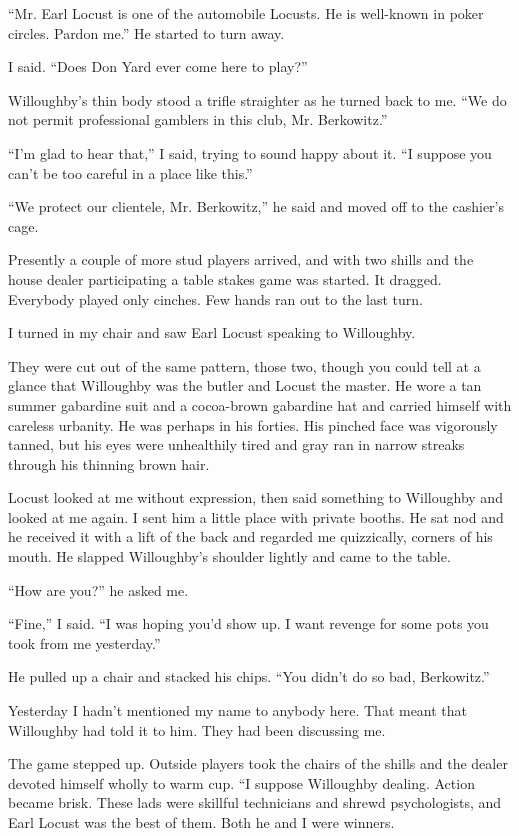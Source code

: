 \documentclass{novel}
\begin{document}
“Mr. Earl Locust is one of the automobile Locusts. He is well-known in poker circles. Pardon me.” He started to turn away.

I said. “Does Don Yard ever come here to play?”

Willoughby’s thin body stood a trifle straighter as he turned back to me. “We do not permit professional gamblers in this club, Mr. Berkowitz.”

“I’m glad to hear that,” I said, trying to sound happy about it. “I suppose you can’t be too careful in a place like this.”

“We protect our clientele, Mr. Berkowitz,” he said and moved off to the cashier’s cage.

Presently a couple of more stud players arrived, and with two shills and the house dealer participating a table stakes game was started. It dragged. Everybody played only cinches. Few hands ran out to the last turn.

\scenestars

I turned in my chair and saw Earl Locust speaking to Willoughby.

They were cut out of the same pattern, those two, though you could tell at a glance that Willoughby was the butler and Locust the master. He wore a tan summer gabardine suit and a cocoa-brown gabardine hat and carried himself with careless urbanity. He was perhaps in his forties. His pinched face was vigorously tanned, but his eyes were unhealthily tired and gray ran in narrow streaks through his thinning brown hair.

Locust looked at me without expression, then said something to Willoughby and looked at me again. I sent him a little place with private booths. He sat nod and he received it with a lift of the back and regarded me quizzically, corners of his mouth. He slapped Willoughby’s shoulder lightly and came to the table.

“How are you?” he asked me.

“Fine,” I said. “I was hoping you’d show up. I want revenge for some pots you took from me yesterday.”

He pulled up a chair and stacked his chips. “You didn’t do so bad, Berkowitz.”

Yesterday I hadn’t mentioned my name to anybody here. That meant that Willoughby had told it to him. They had been discussing me.

The game stepped up. Outside players took the chairs of the shills and the dealer devoted himself wholly to warm cup. “I suppose Willoughby dealing. Action became brisk. These lads were skillful technicians and shrewd psychologists, and Earl Locust was the best of them. Both he and I were winners.
\end{document}
